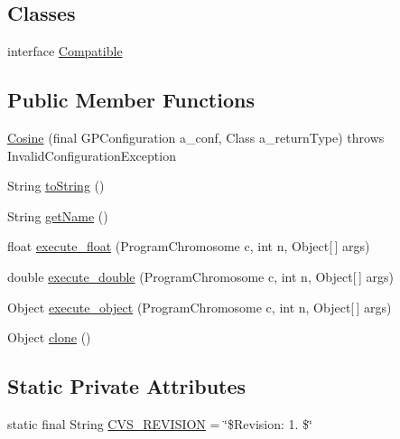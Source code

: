 \subsection*{Classes}
\begin{DoxyCompactItemize}
\item 
interface \hyperlink{interfaceorg_1_1jgap_1_1gp_1_1function_1_1_cosine_1_1_compatible}{Compatible}
\end{DoxyCompactItemize}
\subsection*{Public Member Functions}
\begin{DoxyCompactItemize}
\item 
\hyperlink{classorg_1_1jgap_1_1gp_1_1function_1_1_cosine_ae5d0732dbfa6ea820a72ced5aab0a9c2}{Cosine} (final G\-P\-Configuration a\-\_\-conf, Class a\-\_\-return\-Type)  throws Invalid\-Configuration\-Exception 
\item 
String \hyperlink{classorg_1_1jgap_1_1gp_1_1function_1_1_cosine_a61e0f577959d483dbc0db6d2d7a12d3c}{to\-String} ()
\item 
String \hyperlink{classorg_1_1jgap_1_1gp_1_1function_1_1_cosine_a75fb7ce40e0e90b26b1ee1bb53d3ffe1}{get\-Name} ()
\item 
float \hyperlink{classorg_1_1jgap_1_1gp_1_1function_1_1_cosine_aa7d805678f669666c95aeaddafb14400}{execute\-\_\-float} (Program\-Chromosome c, int n, Object\mbox{[}$\,$\mbox{]} args)
\item 
double \hyperlink{classorg_1_1jgap_1_1gp_1_1function_1_1_cosine_a5349e787f1b80623e667b7bb7b019ae3}{execute\-\_\-double} (Program\-Chromosome c, int n, Object\mbox{[}$\,$\mbox{]} args)
\item 
Object \hyperlink{classorg_1_1jgap_1_1gp_1_1function_1_1_cosine_a05850ecf0b1b72e0860325da6a6a1784}{execute\-\_\-object} (Program\-Chromosome c, int n, Object\mbox{[}$\,$\mbox{]} args)
\item 
Object \hyperlink{classorg_1_1jgap_1_1gp_1_1function_1_1_cosine_a17507f080d97bbf77e2887412fd934f9}{clone} ()
\end{DoxyCompactItemize}
\subsection*{Static Private Attributes}
\begin{DoxyCompactItemize}
\item 
static final String \hyperlink{classorg_1_1jgap_1_1gp_1_1function_1_1_cosine_a23839b895c6dc1d26c719d64596b25d6}{C\-V\-S\-\_\-\-R\-E\-V\-I\-S\-I\-O\-N} = \char`\"{}\$Revision\-: 1. \$\char`\"{}
\end{DoxyCompactItemize}
